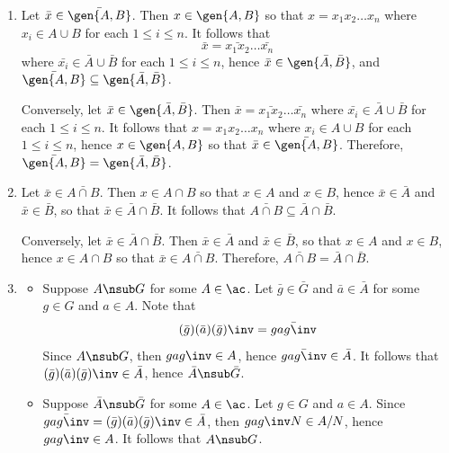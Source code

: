 \begin{sol}
\begin{enumerate}
        Suppose $bA \in \ker\psi$. Then $\psi(bA) = \bar A$ so that $\bar b \bar A = \bar A$. Then $\bar b \in \bar A$, hence $bN \in A/N$, and $b \in A$. Then $bA = A$ which is the identity in $B/A$ so that $\ker\psi = 1$, hence $\psi$ is injective. To show that $\psi$ is surjective, let $\bar b \bar A \in \bar B/\bar A$ for $\bar b \in B$. By definition of $\bar B$, there exists $b \in B$ such that $\bar b = bN$. Then $\psi(bA) = \bar b \bar A$, hence $\psi$ is surjective. Lastly, for any $b_1A, b_2A \in B/A$,
        \[\psi(b_1A \cdot b_2A) = \psi(b_1b_2A) = \bar{b_1b_2} \bar A = \bar b_1 \bar b_2 \bar A = \psi(b_1A) \cdot \psi(b_2A)\]
        so that $\psi$ is a homomorphism. Therefore, $\psi$ is an isomorphism and $|B : A| = |B/A| = |\bar B / \bar A| = |\bar B : \bar A|$.
        \item Let $\bar x \in \bar{\gen{A, B}}$. Then $x \in \gen{A, B}$ so that $x = x_1x_2 \ldots x_n$ where $x_i \in A \cup B$ for each $1 \leq i \leq n$. It follows that
        \[\bar x = \bar{x_1x_2} \ldots \bar{x_n}\]
        where $\bar{x_i} \in \bar A \cup \bar B$ for each $1 \leq i \leq n$, hence $\bar x \in \gen{\bar A, \bar B}$, and $\bar{\gen{A, B}} \subseteq \gen{\bar A, \bar B}$. 
        
        Conversely, let $\bar x \in \gen{\bar A, \bar B}$. Then $\bar x = \bar{x_1x_2} \ldots \bar{x_n}$ where $\bar{x_i} \in \bar A \cup \bar B$ for each $1 \leq i \leq n$. It follows that $x = x_1x_2 \ldots x_n$ where $x_i \in A \cup B$ for each $1 \leq i \leq n$, hence $x \in \gen{A, B}$ so that $\bar x \in \bar{\gen{A, B}}$. Therefore, $\bar{\gen{A, B}} = \gen{\bar A, \bar B}$.
        \item Let $\bar x \in \bar{A \cap B}$. Then $x \in A \cap B$ so that $x \in A$ and $x \in B$, hence $\bar x \in \bar A$ and $\bar x \in \bar B$, so that $\bar x \in \bar A \cap \bar B$. It follows that $\bar{A \cap B} \subseteq \bar A \cap \bar B$.
        
        Conversely, let $\bar x \in \bar A \cap \bar B$. Then $\bar x \in \bar A$ and $\bar x \in \bar B$, so that $x \in A$ and $x \in B$, hence $x \in A \cap B$ so that $\bar x \in \bar{A \cap B}$. Therefore, $\bar{A \cap B} = \bar A \cap \bar B$.
        \item 
        \begin{itemize}
            \item[\rightimp] Suppose $A \nsub G$ for some $A \in \ac$. Let $\bar g \in \bar G$ and $\bar a \in \bar A$ for some $g \in G$ and $a \in A$. Note that
            \[(\bar g)(\bar a)(\bar g)\inv = \bar{gag\inv}\]
            Since $A \nsub G$, then $gag\inv \in A$, hence $\bar{gag\inv} \in \bar A$. It follows that $(\bar g)(\bar a)(\bar g)\inv \in \bar A$, hence $\bar A \nsub \bar G$.
            \item[\leftimp] Suppose $\bar A \nsub \bar G$ for some $A \in \ac$. Let $g \in G$ and $a \in A$. Since $\bar{gag\inv} = (\bar g)(\bar a)(\bar g)\inv \in \bar A$, then $gag\inv N \in A/N$, hence $gag\inv \in A$. It follows that $A \nsub G$. \qh
        \end{itemize}
    \end{enumerate}
\end{sol}

